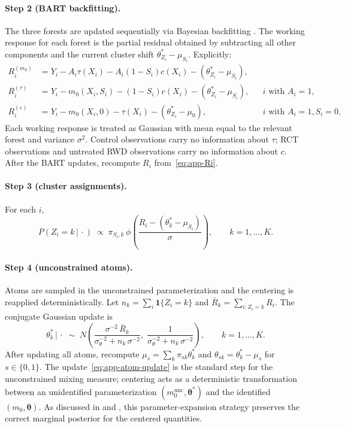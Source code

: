 \documentclass[11pt]{article}
\theoremstyle{plain}
\theoremstyle{definition}
\theoremstyle{remark}
\newcommand{\1}{\mathds{1}}
\newcommand{\given}{\,|\,}
\begin{document}
\paragraph{Step 2 (BART backfitting).} The three forests are updated sequentially via Bayesian backfitting \citep{chipman2010bart}. The working response for each forest is the partial residual obtained by subtracting all other components and the current cluster shift $\theta_{Z_i}^* - \mu_{S_i}$. Explicitly:
\begin{align}
R_i^{(m_0)} &= Y_i - A_i \tau(X_i) - A_i(1-S_i) c(X_i) - (\theta_{Z_i}^* - \mu_{S_i}), \\
R_i^{(\tau)} &= Y_i - m_0(X_i, S_i) - (1-S_i) c(X_i) - (\theta_{Z_i}^* - \mu_{S_i}), && i \text{ with } A_i = 1, \\
R_i^{(c)} &= Y_i - m_0(X_i, 0) - \tau(X_i) - (\theta_{Z_i}^* - \mu_0), && i \text{ with } A_i = 1, S_i = 0.
\end{align}
Each working response is treated as Gaussian with mean equal to the relevant forest and variance $\sigma^2$. Control observations carry no information about $\tau$; RCT observations and untreated RWD observations carry no information about $c$. After the BART updates, recompute $R_i$ from~\eqref{eq:app-Ri}.

\paragraph{Step 3 (cluster assignments).} For each $i$,
\begin{equation}
P(Z_i = k \given \cdot) \;\propto\; \pi_{S_i, k}\, \phi\!\left(\frac{R_i - (\theta_k^* - \mu_{S_i})}{\sigma}\right), \qquad k = 1, \ldots, K.
\label{eq:app-cluster}
\end{equation}

\paragraph{Step 4 (unconstrained atoms).} Atoms are sampled in the unconstrained parameterization and the centering is reapplied deterministically. Let $n_k = \sum_i \mathbf{1}\{Z_i = k\}$ and $\bar R_k = \sum_{i: Z_i = k} R_i$. The conjugate Gaussian update is
\begin{equation}
\theta_k^* \given \cdot \;\sim\; N\!\left(\frac{\sigma^{-2}\, \bar R_k}{\sigma_\theta^{-2} + n_k\, \sigma^{-2}},\; \frac{1}{\sigma_\theta^{-2} + n_k\, \sigma^{-2}}\right), \qquad k = 1, \ldots, K.
\label{eq:app-atom-update}
\end{equation}
After updating all atoms, recompute $\mu_s = \sum_k \pi_{sk} \theta_k^*$ and $\theta_{sk} = \theta_k^* - \mu_s$ for $s \in \{0, 1\}$. The update~\eqref{eq:app-atom-update} is the standard step for the unconstrained mixing measure; centering acts as a deterministic transformation between an unidentified parameterization $(m_0^{\mathrm{unc}}, \bm{\theta}^*)$ and the identified $(m_0, \bm{\theta})$. As discussed in \citet{yang2010semiparametric} and \citet{henderson2020individualized}, this parameter-expansion strategy preserves the correct marginal posterior for the centered quantities.
\end{document}
